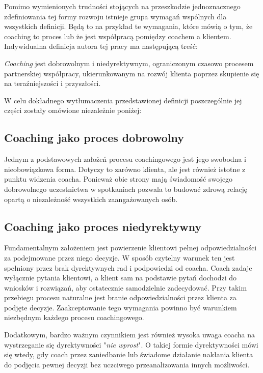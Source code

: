 Pomimo wymienionych trudności stojących na przeszkodzie jednoznacznego zdefiniowania tej formy rozwoju istnieje grupa wymagań wspólnych dla
wszystkich definicji. Będą to na przykład te wymagania, które mówią o tym, że coaching to proces lub że jest współpracą pomiędzy
coachem a klientem. Indywidualna definicja autora tej pracy ma następującą treść:
\begin{defn}
  \emph{Coaching} jest dobrowolnym i niedyrektywnym, ograniczonym czasowo procesem partnerskiej współpracy,
  ukierunkowanym na rozwój klienta poprzez skupienie się na teraźniejszości i przyszłości.
  \label{definicja}
\end{defn}

W celu dokładnego wytłumaczenia przedstawionej definicji poszczególnie jej części zostały omówione niezależnie poniżej:

\subsection{Coaching jako proces dobrowolny}
Jednym z podstawowych założeń procesu coachingowego jest jego swobodna i nieobowiązkowa forma. Dotyczy to zarówno klienta, ale jest
również istotne z punktu widzenia coacha. Ponieważ obie strony mają świadomość swojego dobrowolnego uczestnictwa w spotkaniach pozwala to budować
zdrową relację opartą o niezależność wszystkich zaangażowanych osób.

\subsection{Coaching jako proces niedyrektywny}
Fundamentalnym założeniem jest powierzenie klientowi pełnej odpowiedzialności za podejmowane przez niego decyzje. W sposób czytelny
warunek ten jest spełniony przez brak dyrektywnych rad i podpowiedzi od coacha. Coach zadaje wyłącznie pytania klientowi,
a klient sam na podstawie pytań dochodzi do wniosków i rozwiązań, aby ostatecznie samodzielnie zadecydować. Przy takim przebiegu procesu naturalne jest branie odpowiedzialności
przez klienta za podjęte decyzje. Zaakceptowanie tego wymagania powinno być warunkiem niezbędnym każdego procesu coachingowego.

Dodatkowym, bardzo ważnym czynnikiem jest również wysoka uwaga coacha na wystrzeganie się dyrektywności "\emph{nie wprost}". O takiej formie
dyrektywności mówi się wtedy, gdy coach przez zaniedbanie lub świadome działanie nakłania klienta do podjęcia pewnej decyzji bez uczciwego przeanalizowania
innych możliwości. \\

